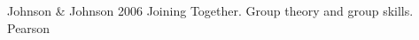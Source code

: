 \begin{thebibliography}{1} %
	Johnson \& Johnson 2006 Joining Together. Group theory and group skills. Pearson

\end{thebibliography}